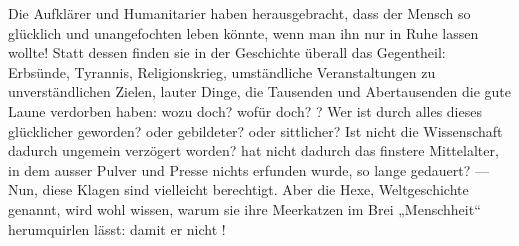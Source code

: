 Die Aufklärer und Humanitarier haben herausgebracht, dass der Mensch so glücklich und unangefochten leben könnte, wenn man ihn nur in Ruhe lassen wollte! Statt dessen finden sie in der Geschichte überall das Gegentheil: Erbsünde, Tyrannis, Religionskrieg, umständliche Veranstaltungen zu unverständlichen Zielen, lauter Dinge, die Tausenden und Abertausenden die gute Laune verdorben haben: wozu doch? wofür doch? ? Wer ist durch alles dieses glücklicher geworden? oder gebildeter? oder sittlicher? Ist nicht die Wissenschaft dadurch ungemein verzögert worden? hat nicht dadurch das finstere Mittelalter, in dem ausser Pulver und Presse nichts erfunden wurde, so lange gedauert? — Nun, diese Klagen sind vielleicht berechtigt. Aber die Hexe, Weltgeschichte genannt, wird wohl wissen, warum sie ihre Meerkatzen im Brei „Menschheit“ herumquirlen lässt: damit er nicht !
\par

